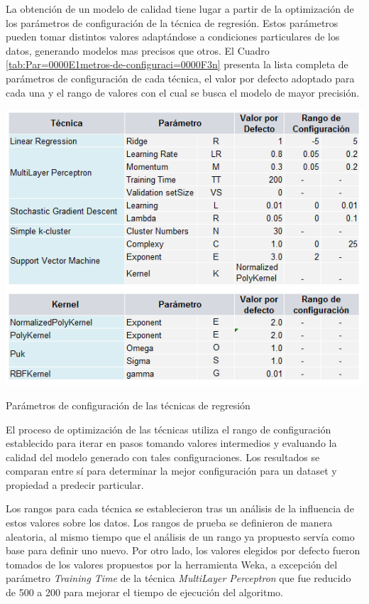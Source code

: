 La obtención de un modelo de calidad tiene lugar a partir de la optimización
de los parámetros de configuración de la técnica de regresión. Estos
parámetros pueden tomar distintos valores adaptándose a condiciones
particulares de los datos, generando modelos mas precisos que otros.
El Cuadro \ref{tab:Par=0000E1metros-de-configuraci=0000F3n} presenta
la lista completa de parámetros de configuración de cada técnica,
el valor por defecto adoptado para cada una y el rango de valores
con el cual se busca el modelo de mayor precisión. 

\begin{table}[H]
\begin{centering}
\includegraphics[scale=0.5]{images/configuration-parameters}
\par\end{centering}

\caption{Parámetros de configuración de las técnicas de regresión \label{tab:Par=0000E1metros-de-configuraci=0000F3n}}
\end{table}


El proceso de optimización de las técnicas utiliza el rango de configuración
establecido para iterar en pasos tomando valores intermedios y evaluando
la calidad del modelo generado con tales configuraciones. Los resultados
se comparan entre sí para determinar la mejor configuración para un
dataset y propiedad a predecir particular. 

Los rangos para cada técnica se establecieron tras un análisis de
la influencia de estos valores sobre los datos. Los rangos de prueba
se definieron de manera aleatoria, al mismo tiempo que el análisis
de un rango ya propuesto servía como base para definir uno nuevo.
Por otro lado, los valores elegidos por defecto fueron tomados de
los valores propuestos por la herramienta Weka, a excepción del parámetro
\emph{Training Time} de la técnica \emph{MultiLayer Perceptron} que
fue reducido de 500 a 200 para mejorar el tiempo de ejecución del
algoritmo. 

